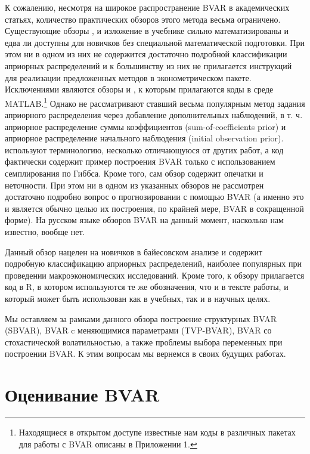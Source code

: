 \documentclass[11pt]{article} %
\begin{document}
К сожалению, несмотря на широкое распространение BVAR в академических статьях, количество практических обзоров этого метода  весьма ограничено. Существующие обзоры \cite{karlsson_2012}, \cite{delnegro_schorfheide_2011} и изложение в учебнике \cite{canova_2007} сильно математизированы и едва ли доступны для новичков без специальной математической подготовки.
 При этом ни в одном из них не содержится достаточно подробной классификации априорных распределений и к большинству из них не прилагается инструкций для реализации предложенных методов в эконометрическом пакете.
Исключениями являются обзоры \cite{koop_korobilis_2010} и \cite{blake_mumtaz_2012}, к которым прилагаются коды в среде MATLAB.\footnote{Находящиеся в открытом доступе известные нам коды в различных пакетах для работы с BVAR описаны в Приложении 1.}
Однако \cite{koop_korobilis_2010} не рассматривают ставший весьма популярным метод задания априорного распределения через добавление дополнительных наблюдений, в т. ч. априорное распределение суммы коэффициентов (sum-of-coefficients prior) и априорное распределение начального наблюдения (initial observation prior).
\cite{blake_mumtaz_2012} используют терминологию, несколько отличающуюся от других работ, а код фактически содержит  пример построения BVAR только с использованием семплирования по Гиббса. Кроме того, сам обзор содержит опечатки и неточности. При этом ни в одном из указанных обзоров не рассмотрен достаточно подробно вопрос о прогнозировании с помощью BVAR (а именно это и является обычно целью их построения, по крайней мере, BVAR в сокращенной форме). На русском языке обзоров BVAR на данный момент, насколько нам  известно, вообще нет.

Данный обзор нацелен на новичков в байесовском анализе и содержит подробную классификацию априорных распределений, наиболее популярных при проведении макроэкономических исследований. Кроме того, к обзору прилагается код в R, в котором используются те же обозначения, что и в тексте работы, и который может быть использован как в учебных, так и в научных целях.

Мы оставляем за рамками данного обзора построение структурных BVAR (SBVAR), BVAR c меняющимися параметрами (TVP-BVAR), BVAR со стохастической волатильностью, а также проблемы выбора переменных при построении BVAR. К этим вопросам мы вернемся в своих будущих работах.





\section{Оценивание BVAR}
\end{document}
